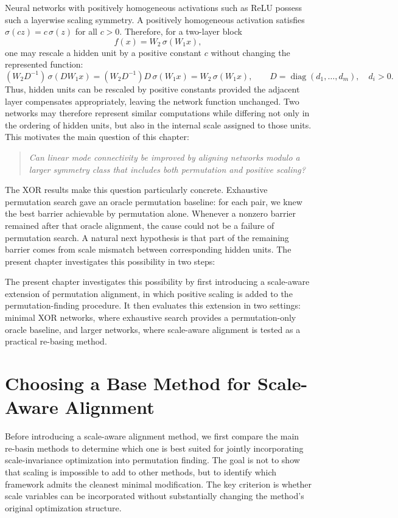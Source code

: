 \documentclass[11pt,a4paper]{report}
\begin{document}
Neural networks with positively homogeneous activations such as ReLU possess such a layerwise scaling symmetry. A positively homogeneous activation satisfies \(\sigma(cz)=c\,\sigma(z)\) for all \(c>0\). Therefore, for a two-layer block
\[
f(x)=W_2\,\sigma(W_1x),
\]
one may rescale a hidden unit by a positive constant \(c\) without changing the represented function:
\[
(W_2D^{-1})\,\sigma(DW_1x)
=(W_2D^{-1})D\,\sigma(W_1x)
=W_2\,\sigma(W_1x), \qquad
D=\operatorname{diag}(d_1,\dots,d_m),\quad d_i>0.
\]
Thus, hidden units can be rescaled by positive constants provided the adjacent layer compensates appropriately, leaving the network function unchanged. Two networks may therefore represent similar computations while differing not only in the ordering of hidden units, but also in the internal scale assigned to those units. This motivates the main question of this chapter:

\begin{quote}
\textit{Can linear mode connectivity be improved by aligning networks modulo a larger symmetry class that includes both permutation and positive scaling?}
\end{quote}

The XOR results make this question particularly concrete. Exhaustive permutation search gave an oracle permutation baseline: for each pair, we knew the best barrier achievable by permutation alone. Whenever a nonzero barrier remained after that oracle alignment, the cause could not be a failure of permutation search. A natural next hypothesis is that part of the remaining barrier comes from scale mismatch between corresponding hidden units.  The present chapter investigates this possibility in two steps:

The present chapter investigates this possibility by first introducing a scale-aware extension of permutation alignment, in which positive scaling is added to the permutation-finding procedure. It then evaluates this extension in two settings: minimal XOR networks, where exhaustive search provides a permutation-only oracle baseline, and larger networks, where scale-aware alignment is tested as a practical re-basing method.


\section{Choosing a Base Method for Scale-Aware Alignment}

Before introducing a scale-aware alignment method, we first compare the main re-basin methods to determine which one is best suited for jointly incorporating scale-invariance optimization into permutation finding. The goal is not to show that scaling is impossible to add to other methods, but to identify which framework admits the cleanest minimal modification. The key criterion is whether scale variables can be incorporated without substantially changing the method's original optimization structure.
\end{document}
